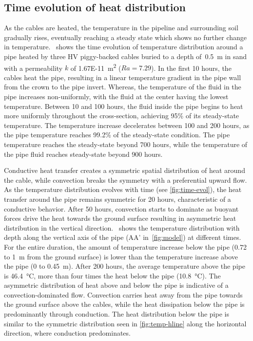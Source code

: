 \documentclass[Journal,letterpaper,InsideFigs]{ascelike-new}
\begin{document}
\subsection*{Time evolution of heat distribution}
As the cables are heated, the temperature in the pipeline and surrounding soil gradually rises, eventually reaching a steady state which shows no further change in temperature.~ shows the time evolution of temperature distribution around a pipe heated by three HV piggy-backed cables buried to a depth of~\SI{0.5}{\meter} in sand with a permeability $k$ of \SI{1.67E-11}{\meter\squared} ($Ra = 7.29$). In the first 10 hours, the cables heat the pipe, resulting in a linear temperature gradient in the pipe wall from the crown to the pipe invert. Whereas, the temperature of the fluid in the pipe increases non-uniformly, with the fluid at the center having the lowest temperature. Between 10 and 100 hours, the fluid inside the pipe begins to heat more uniformly throughout the cross-section, achieving 95\% of its steady-state temperature. The temperature increase decelerates between 100 and 200 hours, as the pipe temperature reaches 99.2\% of the steady-state condition. The pipe temperature reaches the steady-state beyond 700 hours, while the temperature of the pipe fluid reaches steady-state beyond 900 hours. 

Conductive heat transfer creates a symmetric spatial distribution of heat around the cable, while convection breaks the symmetry with a preferential upward flow. As the temperature distribution evolves with time (see \cref{fig:time-evol}), the heat transfer around the pipe remains symmetric for 20 hours, characteristic of a conductive behavior. After 50 hours, convection starts to dominate as buoyant forces drive the heat towards the ground surface resulting in asymmetric heat distribution in the vertical direction.~ shows the temperature distribution with depth along the vertical axis of the pipe (AA’ in~\cref{fig:model}) at different times. For the entire duration, the amount of temperature increase below the pipe (0.72 to \SI{1}{\meter} from the ground surface) is lower than the temperature increase above the pipe (0 to \SI{0.45}{\meter}). After 200 hours, the average temperature above the pipe is \SI{46.4}{\celsius}, more than four times the heat below the pipe (\SI{10.8}{\celsius}). The asymmetric distribution of heat above and below the pipe is indicative of a convection-dominated flow. Convection carries heat away from the pipe towards the ground surface above the cables, while the heat dissipation below the pipe is predominantly through conduction. The heat distribution below the pipe is similar to the symmetric distribution seen in \cref{fig:temp-hline} along the horizontal direction, where conduction predominates. 
\end{document}
